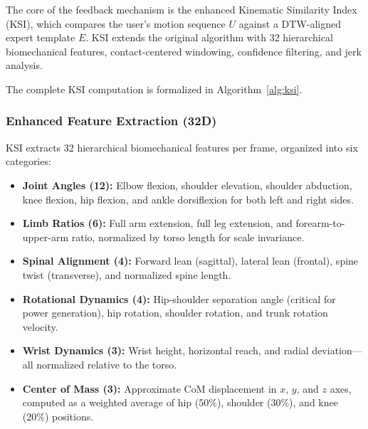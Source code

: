 \documentclass[pdflatex,sn-mathphys-num]{sn-jnl}%
\theoremstyle{thmstyleone}%
\theoremstyle{thmstyletwo}%
\theoremstyle{thmstylethree}%
\begin{document}
The core of the feedback mechanism is the enhanced Kinematic Similarity Index (KSI), which compares the user's motion sequence $U$ against a DTW-aligned expert template $E$. KSI extends the original algorithm with 32 hierarchical biomechanical features, contact-centered windowing, confidence filtering, and jerk analysis.

The complete KSI computation is formalized in Algorithm~\ref{alg:ksi}.


\subsubsection{Enhanced Feature Extraction (32D)}
KSI extracts 32 hierarchical biomechanical features per frame, organized into six categories:
\begin{itemize}
    \item \textbf{Joint Angles (12):} Elbow flexion, shoulder elevation, shoulder abduction, knee flexion, hip flexion, and ankle dorsiflexion for both left and right sides.
    \item \textbf{Limb Ratios (6):} Full arm extension, full leg extension, and forearm-to-upper-arm ratio, normalized by torso length for scale invariance.
    \item \textbf{Spinal Alignment (4):} Forward lean (sagittal), lateral lean (frontal), spine twist (transverse), and normalized spine length.
    \item \textbf{Rotational Dynamics (4):} Hip-shoulder separation angle (critical for power generation), hip rotation, shoulder rotation, and trunk rotation velocity.
    \item \textbf{Wrist Dynamics (3):} Wrist height, horizontal reach, and radial deviation---all normalized relative to the torso.
    \item \textbf{Center of Mass (3):} Approximate CoM displacement in $x$, $y$, and $z$ axes, computed as a weighted average of hip (50\%), shoulder (30\%), and knee (20\%) positions.
\end{itemize}
\end{document}
